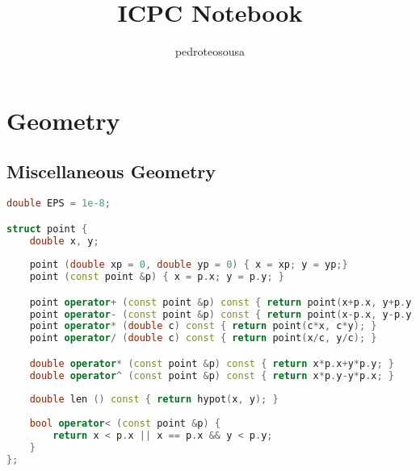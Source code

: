 \documentclass{article}
\title{ICPC Notebook}
\author{pedroteosousa }
\date{}
\begin{document}
\maketitle
\tableofcontents

\section{Geometry}
\subsection{Miscellaneous Geometry}
\begin{lstlisting}[language=C++]
double EPS = 1e-8;

struct point {
    double x, y;
    
	point (double xp = 0, double yp = 0) { x = xp; y = yp;}
    point (const point &p) { x = p.x; y = p.y; }

    point operator+ (const point &p) const { return point(x+p.x, y+p.y); }
    point operator- (const point &p) const { return point(x-p.x, y-p.y); }
    point operator* (double c) const { return point(c*x, c*y); }
    point operator/ (double c) const { return point(x/c, y/c); }

	double operator* (const point &p) const { return x*p.x+y*p.y; }
	double operator^ (const point &p) const { return x*p.y-y*p.x; }
	
	double len () const { return hypot(x, y); }
    
	bool operator< (const point &p) {
		return x < p.x || x == p.x && y < p.y;
	}
};
\end{lstlisting}
\end{document}
